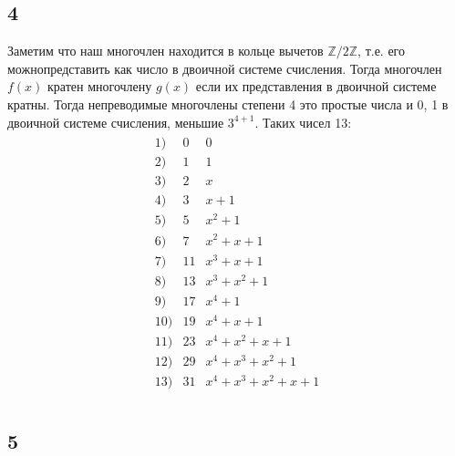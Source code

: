 		\subsection{4}	
		Заметим что наш многочлен находится в кольце вычетов $\mathbb{Z} / 2\mathbb{Z}$, т.е. его можнопредставить как число в двоичной системе счисления. Тогда многочлен $f(x)$ кратен многочлену $g(x)$ если их представления в двоичной системе кратны. Тогда непреводимые многочлены степени 4 это простые числа и 0, 1 в двоичной системе счисления, меньшие $3^{4+1}$. Таких чисел 13:
		\begin{gather*} 
			\begin{matrix}
				1)  & 0  & 0\\ 
				2)  & 1  & 1\\ 
				3)  & 2  & x\\ 
				4)  & 3  & x+1\\ 
				5)  & 5  & x^2 + 1\\ 
				6)  & 7  & x^2 + x + 1\\ 
				7)  & 11 & x^3 + x + 1\\ 
				8)  & 13 & x^3 + x^2 + 1\\ 
				9)  & 17 & x^4 + 1\\ 
				10) & 19 & x^4 + x + 1\\ 
				11) & 23 & x^4 + x^2 + x + 1\\ 
				12) & 29 & x^4 + x^3 + x^2 + 1\\ 
				13) & 31 & x^4 + x^3 + x^2 + x + 1\\
			\end{matrix}
		\end{gather*}
		\subsection{5}	
			
